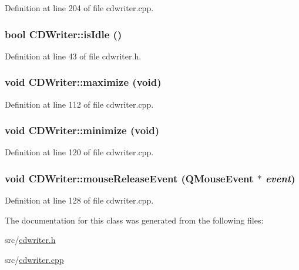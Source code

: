 Definition at line 204 of file cdwriter.cpp.\hypertarget{classCDWriter_ad6c510839af2c175cfabeaa3067431b}{
\subsubsection[{isIdle}]{\setlength{\rightskip}{0pt plus 5cm}bool CDWriter::isIdle ()}}
\label{classCDWriter_ad6c510839af2c175cfabeaa3067431b}




Definition at line 43 of file cdwriter.h.\hypertarget{classCDWriter_2ea8afb43e2cdcd07b0d783dcf5ac989}{
\subsubsection[{maximize}]{\setlength{\rightskip}{0pt plus 5cm}void CDWriter::maximize (void)}}
\label{classCDWriter_2ea8afb43e2cdcd07b0d783dcf5ac989}




Definition at line 112 of file cdwriter.cpp.\hypertarget{classCDWriter_a3db5f6361622dd83a529340df737c11}{
\subsubsection[{minimize}]{\setlength{\rightskip}{0pt plus 5cm}void CDWriter::minimize (void)}}
\label{classCDWriter_a3db5f6361622dd83a529340df737c11}




Definition at line 120 of file cdwriter.cpp.\hypertarget{classCDWriter_712e2295621dccbe6866a3b539a8006c}{
\subsubsection[{mouseReleaseEvent}]{\setlength{\rightskip}{0pt plus 5cm}void CDWriter::mouseReleaseEvent (QMouseEvent $\ast$ {\em event})}}
\label{classCDWriter_712e2295621dccbe6866a3b539a8006c}




Definition at line 128 of file cdwriter.cpp.

The documentation for this class was generated from the following files:\begin{CompactItemize}
\item 
src/\hyperlink{cdwriter_8h}{cdwriter.h}\item 
src/\hyperlink{cdwriter_8cpp}{cdwriter.cpp}\end{CompactItemize}
